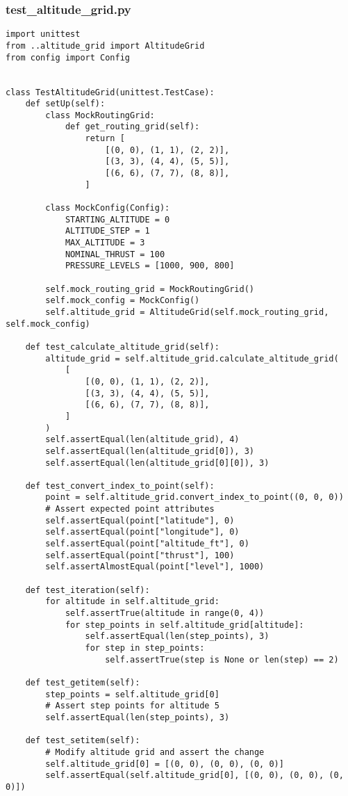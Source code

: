 \subsubsection{test_altitude_grid.py}
\begin{verbatim}
import unittest
from ..altitude_grid import AltitudeGrid
from config import Config


class TestAltitudeGrid(unittest.TestCase):
    def setUp(self):
        class MockRoutingGrid:
            def get_routing_grid(self):
                return [
                    [(0, 0), (1, 1), (2, 2)],
                    [(3, 3), (4, 4), (5, 5)],
                    [(6, 6), (7, 7), (8, 8)],
                ]

        class MockConfig(Config):
            STARTING_ALTITUDE = 0
            ALTITUDE_STEP = 1
            MAX_ALTITUDE = 3
            NOMINAL_THRUST = 100
            PRESSURE_LEVELS = [1000, 900, 800]

        self.mock_routing_grid = MockRoutingGrid()
        self.mock_config = MockConfig()
        self.altitude_grid = AltitudeGrid(self.mock_routing_grid, self.mock_config)

    def test_calculate_altitude_grid(self):
        altitude_grid = self.altitude_grid.calculate_altitude_grid(
            [
                [(0, 0), (1, 1), (2, 2)],
                [(3, 3), (4, 4), (5, 5)],
                [(6, 6), (7, 7), (8, 8)],
            ]
        )
        self.assertEqual(len(altitude_grid), 4)
        self.assertEqual(len(altitude_grid[0]), 3)
        self.assertEqual(len(altitude_grid[0][0]), 3)

    def test_convert_index_to_point(self):
        point = self.altitude_grid.convert_index_to_point((0, 0, 0))
        # Assert expected point attributes
        self.assertEqual(point["latitude"], 0)
        self.assertEqual(point["longitude"], 0)
        self.assertEqual(point["altitude_ft"], 0)
        self.assertEqual(point["thrust"], 100)
        self.assertAlmostEqual(point["level"], 1000)

    def test_iteration(self):
        for altitude in self.altitude_grid:
            self.assertTrue(altitude in range(0, 4))
            for step_points in self.altitude_grid[altitude]:
                self.assertEqual(len(step_points), 3)
                for step in step_points:
                    self.assertTrue(step is None or len(step) == 2)

    def test_getitem(self):
        step_points = self.altitude_grid[0]
        # Assert step points for altitude 5
        self.assertEqual(len(step_points), 3)

    def test_setitem(self):
        # Modify altitude grid and assert the change
        self.altitude_grid[0] = [(0, 0), (0, 0), (0, 0)]
        self.assertEqual(self.altitude_grid[0], [(0, 0), (0, 0), (0, 0)])

\end{verbatim}
